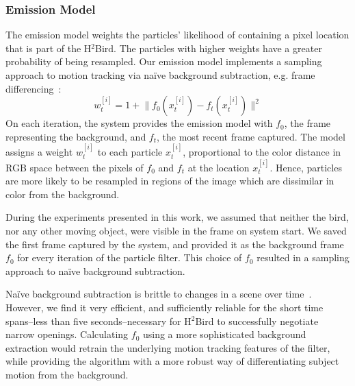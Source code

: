 \documentclass{aamas2013}
\providecommand{\norm}[1]{\lVert#1\rVert}
\begin{document}
\subsubsection{Emission Model}
The emission model weights the particles' likelihood of containing a pixel location that is part of the H$^2$Bird. The particles with higher weights have a greater probability of being resampled. Our emission model implements a sampling
approach to motion tracking via na\"{i}ve background subtraction, e.g. frame 
differencing~\cite{Ahad2011Computer}: 
\begin{equation}
\label{eq:emission_model}
w^{[i]}_t = 1 + \norm{f_0(x^{[i]}_t)-f_t(x^{[i]}_t)}^2
\end{equation} 
On each iteration, the system provides the emission 
model with $f_0$, the frame representing the background, and $f_t$, the most 
recent frame captured. The model assigns a weight $w^{[i]}_t$ to each 
particle $x^{[i]}_t$, proportional to the color distance in RGB space 
between the pixels of $f_0$ and $f_t$ at the location $x^{[i]}_t$.
Hence, particles are more likely to be resampled in regions of 
the image which are dissimilar in color from the background.

During the experiments presented in this work, we assumed that neither the 
bird, nor any other moving object, were visible in the frame on system 
start. We saved the first frame captured by the system, and provided it as 
the background frame $f_0$ for every iteration of the particle filter. This 
choice of $f_0$ resulted in a sampling approach to na\"{i}ve background 
subtraction. 

Na\"{i}ve background subtraction is brittle to changes in a scene over 
time~\cite{Ahad2011Computer}. However, we find it very efficient, and sufficiently 
reliable for the short time spans--less than five seconds--necessary for 
H$^2$Bird to successfully negotiate narrow openings. Calculating $f_0$ 
using a more sophisticated background extraction would retrain the 
underlying motion tracking features of the filter, while providing the 
algorithm with a more robust way of differentiating subject motion from the 
background.

\end{document}
